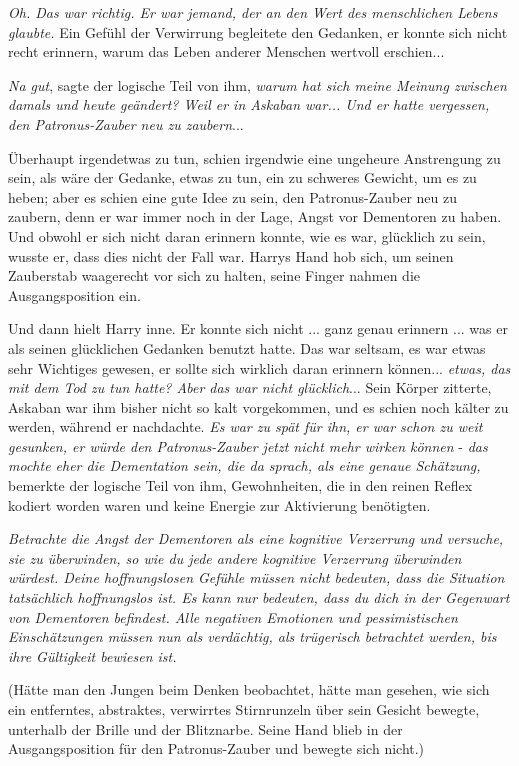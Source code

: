 \emph{Oh. Das war richtig. Er war jemand, der an den Wert des menschlichen
Lebens glaubte.} Ein Gefühl der Verwirrung begleitete den Gedanken, er konnte
sich nicht recht erinnern, warum das Leben anderer Menschen wertvoll erschien...

\emph{Na gut}, sagte der logische Teil von ihm, \emph{warum hat sich meine
Meinung zwischen damals und heute geändert? Weil er in Askaban war... Und er
hatte vergessen, den Patronus-Zauber neu zu zaubern}...

Überhaupt irgendetwas zu tun, schien irgendwie eine ungeheure Anstrengung zu
sein, als wäre der Gedanke, etwas zu tun, ein zu schweres Gewicht, um es zu
heben; aber es schien eine gute Idee zu sein, den Patronus-Zauber neu zu
zaubern, denn er war immer noch in der Lage, Angst vor Dementoren zu haben. Und
obwohl er sich nicht daran erinnern konnte, wie es war, glücklich zu sein,
wusste er, dass dies nicht der Fall war. Harrys Hand hob sich, um seinen
Zauberstab waagerecht vor sich zu halten, seine Finger nahmen die
Ausgangsposition ein.

Und dann hielt Harry inne. Er konnte sich nicht ... ganz genau erinnern ... was
er als seinen glücklichen Gedanken benutzt hatte. Das war seltsam, es war etwas
sehr Wichtiges gewesen, er sollte sich wirklich daran erinnern können...
\emph{etwas, das mit dem Tod zu tun hatte? Aber das war nicht glücklich}... Sein
Körper zitterte, Askaban war ihm bisher nicht so kalt vorgekommen, und es schien
noch kälter zu werden, während er nachdachte. \emph{Es war zu spät für ihn, er
war schon zu weit gesunken, er würde den Patronus-Zauber jetzt nicht mehr wirken
können} - \emph{das mochte eher die Dementation sein, die da sprach, als eine
genaue Schätzung,} bemerkte der logische Teil von ihm, Gewohnheiten, die in den
reinen Reflex kodiert worden waren und keine Energie zur Aktivierung benötigten.

\emph{Betrachte die Angst der Dementoren als eine kognitive Verzerrung und
versuche, sie zu überwinden, so wie du jede andere kognitive Verzerrung
überwinden würdest. Deine hoffnungslosen Gefühle müssen nicht bedeuten, dass die
Situation tatsächlich hoffnungslos ist. Es kann nur bedeuten, dass du dich in
der Gegenwart von Dementoren befindest. Alle negativen Emotionen und
pessimistischen Einschätzungen müssen nun als verdächtig, als trügerisch
betrachtet werden, bis ihre Gültigkeit bewiesen ist.}

(Hätte man den Jungen beim Denken beobachtet, hätte man gesehen, wie sich ein
entferntes, abstraktes, verwirrtes Stirnrunzeln über sein Gesicht bewegte,
unterhalb der Brille und der Blitznarbe. Seine Hand blieb in der
Ausgangsposition für den Patronus-Zauber und bewegte sich nicht.)

